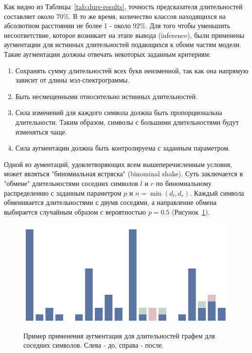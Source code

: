 Как видно из Таблицы~\ref{tab:durs-results}, точность предсказателя длительностей составляет около $70\%$. В то же время, количество классов находящихся на абсолютном расстоянии не более 1 - около $92\%$. Для того чтобы уменьшить несоответствие, которое возникает на этапе вывода (inference), были применены аугментации для истинных длительностей подающихся к обоим частям модели. Такие аугментации должны отвечать некоторых заданным критериям:
\begin{enumerate}
    \item Сохранять сумму длительностей всех букв неизменной, так как она напрямую зависит от длины мэл-спектрограммы.
    \item Быть несмещенными относительно истинных длительностей.
    \item Сила изменений для каждого символа должна быть пропорциональна длительности. Таким образом, символы с большими длительностями будут изменяться чаще.
    \item Сила аугментации должна быть контролируема с заданным параметром.
\end{enumerate}

Одной из аументаций, удовлетворяющих всем вышеперечисленным условия, может являться "биномиальная встряска" (binominal shake). Суть заключается в "обмене" длительностями соседних символов $l$ и $r$ по биномиальному распределению с заданным параметром $p$ и $n=\min(d_l, d_r)$. Каждый символа обменивается длительностями с двумя соседями, а направление обмена выбирается случайным образом с вероятностью $p=0.5$ (Рисунок~\ref{fig:aug}).

\begin{figure}[!ht]
\centering
\includegraphics[width=0.49\textwidth]{images/aug/before.png}
\vrule
\includegraphics[width=0.49\textwidth]{images/aug/after.png}
\caption{Пример применения аугментация для длительностей графем для соседних символов. Слева - до, справа - после.}
\label{fig:aug}
\end{figure}

